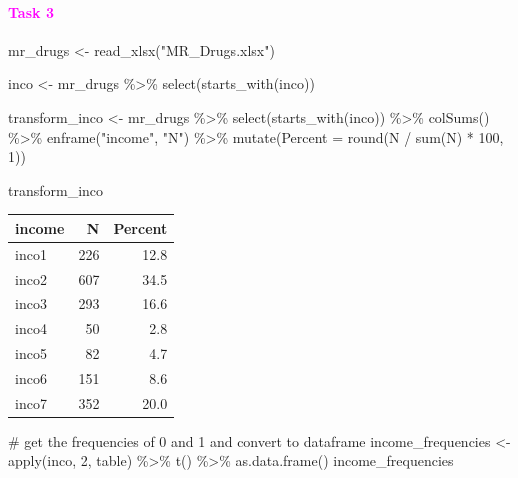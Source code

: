 \documentclass[
]{article}
\newenvironment{Shaded}{}{}
\newcommand{\AttributeTok}[1]{#1}
\newcommand{\CommentTok}[1]{\textcolor[rgb]{0.30,0.53,0.42}{#1}}
\newcommand{\DecValTok}[1]{\textcolor[rgb]{0.00,0.00,0.80}{#1}}
\newcommand{\FunctionTok}[1]{#1}
\newcommand{\NormalTok}[1]{#1}
\newcommand{\OtherTok}[1]{\textcolor[rgb]{1.00,0.25,0.00}{#1}}
\newcommand{\SpecialCharTok}[1]{\textcolor[rgb]{0.00,0.50,0.50}{#1}}
\newcommand{\StringTok}[1]{\textcolor[rgb]{0.01,0.42,0.03}{#1}}
\begin{document}
\hypertarget{section-3}{%
\paragraph{\texorpdfstring{\textbf{\textcolor{magenta}{Task 3}}}{}}\label{section-3}}

\begin{Shaded}
\begin{Highlighting}[]
\NormalTok{mr\_drugs }\OtherTok{\textless{}{-}} \FunctionTok{read\_xlsx}\NormalTok{(}\StringTok{"MR\_Drugs.xlsx"}\NormalTok{)}

\NormalTok{inco }\OtherTok{\textless{}{-}}\NormalTok{ mr\_drugs }\SpecialCharTok{\%\textgreater{}\%} \FunctionTok{select}\NormalTok{(}\FunctionTok{starts\_with}\NormalTok{(}\StringTok{\textquotesingle{}inco\textquotesingle{}}\NormalTok{))}

\NormalTok{transform\_inco }\OtherTok{\textless{}{-}}\NormalTok{ mr\_drugs }\SpecialCharTok{\%\textgreater{}\%} \FunctionTok{select}\NormalTok{(}\FunctionTok{starts\_with}\NormalTok{(}\StringTok{\textquotesingle{}inco\textquotesingle{}}\NormalTok{)) }\SpecialCharTok{\%\textgreater{}\%}
  \FunctionTok{colSums}\NormalTok{() }\SpecialCharTok{\%\textgreater{}\%}
  \FunctionTok{enframe}\NormalTok{(}\StringTok{"income"}\NormalTok{, }\StringTok{"N"}\NormalTok{) }\SpecialCharTok{\%\textgreater{}\%}
  \FunctionTok{mutate}\NormalTok{(}\AttributeTok{Percent =} \FunctionTok{round}\NormalTok{(N }\SpecialCharTok{/} \FunctionTok{sum}\NormalTok{(N) }\SpecialCharTok{*} \DecValTok{100}\NormalTok{, }\DecValTok{1}\NormalTok{))}

\NormalTok{transform\_inco}
\end{Highlighting}
\end{Shaded}

\begin{longtable}[]{@{}lrr@{}}
\toprule\noalign{}
income & N & Percent \\
\midrule\noalign{}
\endhead
\bottomrule\noalign{}
\endlastfoot
inco1 & 226 & 12.8 \\
inco2 & 607 & 34.5 \\
inco3 & 293 & 16.6 \\
inco4 & 50 & 2.8 \\
inco5 & 82 & 4.7 \\
inco6 & 151 & 8.6 \\
inco7 & 352 & 20.0 \\
\end{longtable}

\begin{Shaded}
\begin{Highlighting}[]
\CommentTok{\# get the frequencies of 0 and 1 and convert to dataframe}
\NormalTok{income\_frequencies }\OtherTok{\textless{}{-}} \FunctionTok{apply}\NormalTok{(inco, }\DecValTok{2}\NormalTok{, table) }\SpecialCharTok{\%\textgreater{}\%} 
  \FunctionTok{t}\NormalTok{() }\SpecialCharTok{\%\textgreater{}\%} \FunctionTok{as.data.frame}\NormalTok{()}
\NormalTok{income\_frequencies}
\end{Highlighting}
\end{Shaded}
\end{document}
